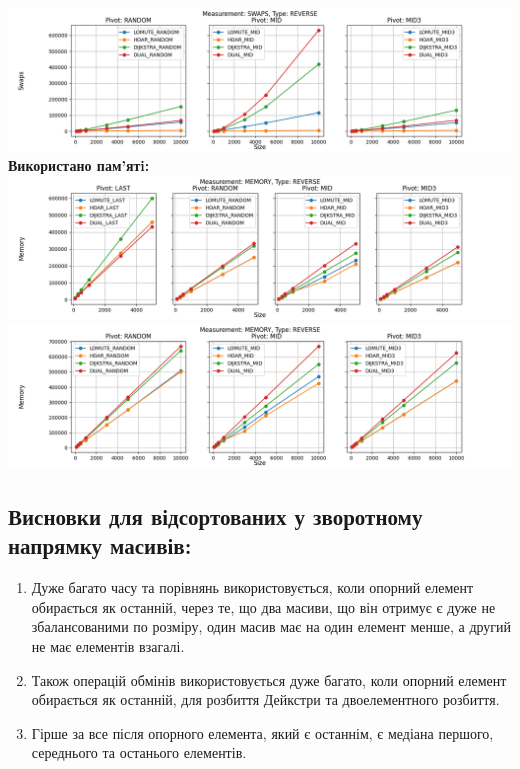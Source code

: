 \documentclass{article}
\begin{document}
        \includegraphics[scale=0.5]{reverse_Swaps_3_pivots_7_numbers.png}
        \newline
    \newpage
    \textbf{Використано пам’ятi:}
    \newline
        \includegraphics[scale=0.5]{reverse_Memory_6_numbers.png}
        \includegraphics[scale=0.5]{reverse_Memory_3_pivots_7_numbers.png}
    \subsection{Висновки для відсортованих у зворотному напрямку масивів:}
    \begin{enumerate}
        \item Дуже багато часу та порівнянь використовується, коли опорний елемент обирається як останній, через те, що два масиви, що він отримує є дуже не збалансованими по розміру, один масив має на один елемент менше, а другий не має елементів взагалі.
        \item Також операцій обмінів використовується дуже багато, коли опорний елемент обирається як останній, для розбиття Дейкстри та двоелементного розбиття.
        \item Гірше за все після опорного елемента, який є останнім, є медіана першого, середнього та останього елементів.
    \end{enumerate}
    \newpage
\end{document}
